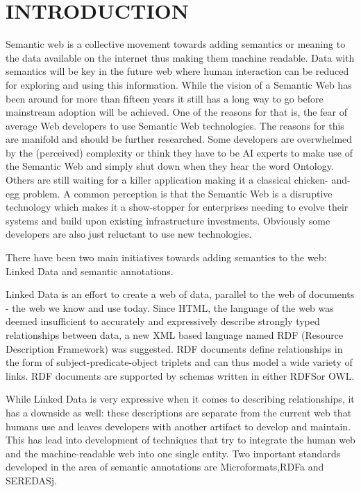 \chapter{INTRODUCTION}
\begin{spacing}{1.5}
Semantic web is a collective movement towards adding semantics or meaning to the data available on the internet thus making them machine readable. Data with semantics will be key in the future web where human interaction can be reduced for exploring and using this information. While the vision of a Semantic Web has been around for more than fifteen years it still has a long way to go before mainstream adoption will be achieved. One of the reasons for that is, the fear of average Web developers to use Semantic Web technologies. The reasons for this are manifold and should be further researched. Some developers are overwhelmed by the (perceived) complexity or think they have to be AI experts to make use of the Semantic Web and simply shut down when they hear the word Ontology. Others are still  waiting for a killer application making it a classical chicken- and-egg problem. A common perception is that the Semantic Web is a disruptive technology which makes it a show-stopper for enterprises needing to evolve their systems and build upon existing infrastructure investments. Obviously some developers are also just reluctant to use new technologies. 

There have been two main initiatives towards adding semantics to the web: Linked Data and semantic annotations. 

Linked Data is an effort to create a web of data, parallel to the web of documents - the web we know and use today\cite{1}. Since HTML, the language of the web was deemed insufficient to accurately and expressively describe strongly typed relationships between data, a new XML based language named RDF (Resource Description Framework) was suggested\cite{2}. RDF documents define relationships in the form of subject-predicate-object triplets and can thus model a wide variety of links. RDF documents are supported by schemas written in either RDFS\cite{3}or OWL\cite{4}\cite{5}.

While Linked Data is very expressive when it comes to describing relationships, it has a downside as well: these descriptions are separate from the current web that humans use and leaves developers with another artifact to develop and maintain. This has lead into development of techniques that try to integrate the human web and the machine-readable web into one single entity. Two important standards developed in the area of semantic annotations are Microformats\cite{6},RDFa\cite{7}\cite{8} and SEREDASj\cite{14}. 


\end{spacing}
